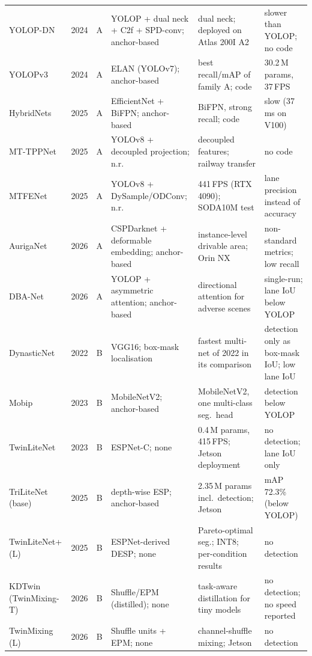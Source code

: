 \begin{table}[!htbp]
\begin{tabularx}{\linewidth}{L{2.6cm} c c L{3.6cm} X X}
YOLOP-DN~\cite{tang2024yolopdn} & 2024 & A & YOLOP + dual neck + C2f + SPD-conv; anchor-based & dual neck; deployed on Atlas 200I A2 & slower than YOLOP; no code \\
YOLOPv3~\cite{zhan2024yolopv3} & 2024 & A & ELAN (YOLOv7); anchor-based & best recall/mAP of family A; code & 30.2\,M params, 37\,FPS \\
HybridNets~\cite{vu2025hybridnets} & 2025 & A & EfficientNet + BiFPN; anchor-based & BiFPN, strong recall; code & slow (37\,ms on V100) \\
MT-TPPNet~\cite{mttppnet2025} & 2025 & A & YOLOv8 + decoupled projection; n.r. & decoupled features; railway transfer & no code \\
MTFENet~\cite{mtfenet2025} & 2025 & A & YOLOv8 + DySample/ODConv; n.r. & 441\,FPS (RTX 4090); SODA10M test & lane precision instead of accuracy \\
AurigaNet~\cite{ghasemzadeh2026auriganet} & 2026 & A & CSPDarknet + deformable embedding; anchor-based & instance-level drivable area; Orin NX & non-standard metrics; low recall \\
DBA-Net~\cite{dbanet2026} & 2026 & A & YOLOP + asymmetric attention; anchor-based & directional attention for adverse scenes & single-run; lane IoU below YOLOP \\
DynasticNet~\cite{caldiran2022dynasticnet} & 2022 & B & VGG16; box-mask localisation & fastest multi-net of 2022 in its comparison & detection only as box-mask IoU; low lane IoU \\
Mobip~\cite{ye2023mobip} & 2023 & B & MobileNetV2; anchor-based & MobileNetV2, one multi-class seg.\ head & detection below YOLOP \\
TwinLiteNet~\cite{che2023twinlitenet} & 2023 & B & ESPNet-C; none & 0.4\,M params, 415\,FPS; Jetson deployment & no detection; lane IoU only \\
TriLiteNet (base)~\cite{trilitenet2025} & 2025 & B & depth-wise ESP; anchor-based & 2.35\,M params incl.\ detection; Jetson & mAP 72.3\% (below YOLOP) \\
TwinLiteNet+ (L)~\cite{che2025twinliteplus} & 2025 & B & ESPNet-derived DESP; none & Pareto-optimal seg.; INT8; per-condition results & no detection \\
KDTwin (TwinMixing-T)~\cite{kdtwin2026} & 2026 & B & Shuffle/EPM (distilled); none & task-aware distillation for tiny models & no detection; no speed reported \\
TwinMixing (L)~\cite{twinmixing2026} & 2026 & B & Shuffle units + EPM; none & channel-shuffle mixing; Jetson & no detection \\

\end{tabularx}
\end{table}
